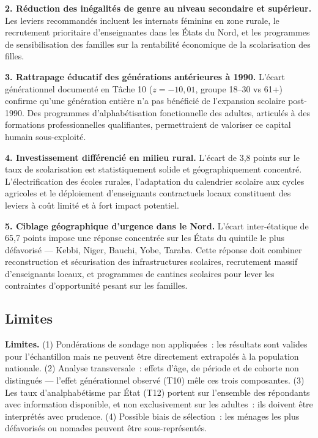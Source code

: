\documentclass[
]{article}
\begin{document}
\textbf{2. Réduction des inégalités de genre au niveau secondaire et
supérieur.} Les leviers recommandés incluent les internats féminins en
zone rurale, le recrutement prioritaire d'enseignantes dans les États du
Nord, et les programmes de sensibilisation des familles sur la
rentabilité économique de la scolarisation des filles.

\textbf{3. Rattrapage éducatif des générations antérieures à 1990.}
L'écart générationnel documenté en Tâche 10 (\(z = -10{,}01\), groupe
18--30 vs 61+) confirme qu'une génération entière n'a pas bénéficié de
l'expansion scolaire post-1990. Des programmes d'alphabétisation
fonctionnelle des adultes, articulés à des formations professionnelles
qualifiantes, permettraient de valoriser ce capital humain
sous-exploité.

\textbf{4. Investissement différencié en milieu rural.} L'écart de 3,8
points sur le taux de scolarisation est statistiquement solide et
géographiquement concentré. L'électrification des écoles rurales,
l'adaptation du calendrier scolaire aux cycles agricoles et le
déploiement d'enseignants contractuels locaux constituent des leviers à
coût limité et à fort impact potentiel.

\textbf{5. Ciblage géographique d'urgence dans le Nord.} L'écart
inter-étatique de 65,7 points impose une réponse concentrée sur les
États du quintile le plus défavorisé --- Kebbi, Niger, Bauchi, Yobe,
Taraba. Cette réponse doit combiner reconstruction et sécurisation des
infrastructures scolaires, recrutement massif d'enseignants locaux, et
programmes de cantines scolaires pour lever les contraintes
d'opportunité pesant sur les familles.

\subsection{Limites}\label{limites}

\begin{alertbox}
\textbf{Limites.} (1) Pondérations de sondage non appliquées~: les résultats sont valides pour l'échantillon mais ne peuvent être directement extrapolés à la population nationale. (2) Analyse transversale~: effets d'âge, de période et de cohorte non distingués --- l'effet générationnel observé (T10) mêle ces trois composantes. (3) Les taux d'analphabétisme par État (T12) portent sur l'ensemble des répondants avec information disponible, et non exclusivement sur les adultes~: ils doivent être interprétés avec prudence. (4) Possible biais de sélection~: les ménages les plus défavorisés ou nomades peuvent être sous-représentés.
\end{alertbox}
\end{document}
